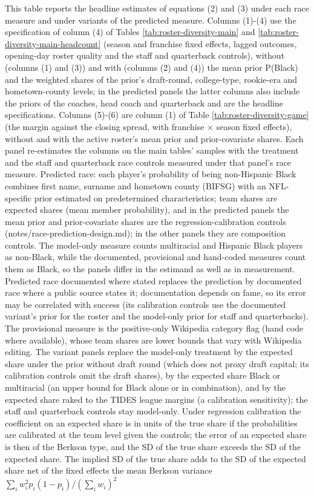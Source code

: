 \begin{table}[!h]
{\begin{threeparttable}
\begin{tablenotes}[para]
\item This table reports the headline estimates of equations (2) and (3) under each race measure and under variants of the predicted measure. Columns (1)-(4) use the specification of column (4) of Tables \ref{tab:roster-diversity-main} and \ref{tab:roster-diversity-main-headcount} (season and franchise fixed effects, lagged outcomes, opening-day roster quality and the staff and quarterback controls), without (columns (1) and (3)) and with (columns (2) and (4)) the mean prior P(Black) and the weighted shares of the prior's draft-round, college-type, rookie-era and hometown-county levels; in the predicted panels the latter columns also include the priors of the coaches, head coach and quarterback and are the headline specifications. Columns (5)-(6) are column (1) of Table \ref{tab:roster-diversity-game} (the margin against the closing spread, with franchise $\times$ season fixed effects), without and with the active roster's mean prior and prior-covariate shares. Each panel re-estimates the columns on the main tables' samples with the treatment and the staff and quarterback race controls measured under that panel's race measure. Predicted race: each player's probability of being non-Hispanic Black combines first name, surname and hometown county (BIFSG) with an NFL-specific prior estimated on predetermined characteristics; team shares are expected shares (mean member probability), and in the predicted panels the mean prior and prior-covariate shares are the regression-calibration controls (notes/race-prediction-design.md); in the other panels they are composition controls. The model-only measure counts multiracial and Hispanic Black players as non-Black, while the documented, provisional and hand-coded measures count them as Black, so the panels differ in the estimand as well as in measurement. Predicted race documented where stated replaces the prediction by documented race where a public source states it; documentation depends on fame, so its error may be correlated with success (its calibration controls use the documented variant's prior for the roster and the model-only prior for staff and quarterbacks). The provisional measure is the positive-only Wikipedia category flag (hand code where available), whose team shares are lower bounds that vary with Wikipedia editing.  The variant panels replace the model-only treatment by the expected share under the prior without draft round (which does not proxy draft capital; its calibration controls omit the draft shares), by the expected share Black or multiracial (an upper bound for Black alone or in combination), and by the expected share raked to the TIDES league margins (a calibration sensitivity); the staff and quarterback controls stay model-only. Under regression calibration the coefficient on an expected share is in units of the true share if the probabilities are calibrated at the team level given the controls; the error of an expected share is then of the Berkson type, and the SD of the true share exceeds the SD of the expected share. The implied SD of the true share adds to the SD of the expected share net of the fixed effects the mean Berkson variance $\sum_i w_i^2 p_i(1-p_i)/(\sum_i w_i)^2$ 
\end{tablenotes}
\end{threeparttable}}
\end{table}

